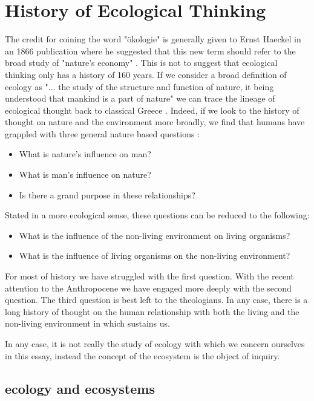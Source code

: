 \section {History of Ecological Thinking}

The credit for coining the word "ökologie" is generally given to Ernst Haeckel in an 1866 publication where he suggested that this new term should refer to the broad study of "nature's economy" \cite{worster_1977}. This is not to suggest that ecological thinking only has a history of 160 years. If we consider a broad definition of ecology as "... the study of the structure and function of nature, it being understood that mankind is a part of nature" we can trace the lineage of ecological thought back to classical Greece \cite{odum_1953}. Indeed, if we look to the history of thought on nature and the environment more broadly, we find that humans have grappled with three general nature based questions \cite{glacken_1967}: \begin{itemize} \item What is nature's influence on man? \item What is man's influence on nature? \item Is there a grand purpose in these relationships? \end{itemize} Stated in a more ecological sense, these questions can be reduced to the following: \begin{itemize} \item What is the influence of the non-living environment on living organisms? \item What is the influence of living organisms on the non-living environment? \end{itemize} For most of history we have struggled with the first question. With the recent attention to the Anthropocene we have engaged more deeply with the second question. The third question is best left to the theologians. In any case, there is a long history of thought on the human relationship with both the living and the non-living environment in which sustains us.

In any case, it is not really the study of ecology with which we concern ourselves in this essay, instead the concept of the ecosystem is the object of inquiry.

\subsection{ecology and ecosystems}



